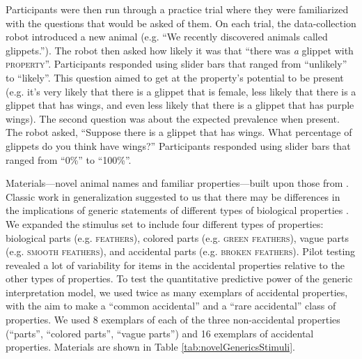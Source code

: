 \documentclass[10pt,letterpaper]{article}
\begin{document}
Participants were then run through a practice trial where they were familiarized with the questions that would be asked of them. 
On each trial, the data-collection robot introduced a new animal (e.g. ``We recently discovered animals called glippets.''). 
The robot then asked how likely it was that ``there was \emph{a} glippet with \textsc{property}''. 
Participants responded using slider bars that ranged from ``unlikely'' to ``likely''.
This question aimed to get at the property's potential to be present
(e.g. it's very likely that there is a glippet that is female, less likely that there is a glippet that has wings, and even less likely that there is a glippet that has purple wings). 
The second question was about the expected prevalence when present. 
The robot asked, ``Suppose there is a glippet that has wings. What percentage of glippets do you think have wings?'' 
Participants responded using slider bars that ranged from ``0\%'' to ``100\%''.


Materials---novel animal names and familiar properties---built upon those from . 
Classic work in generalization suggested to us that there may be differences in the implications of generic statements of different types of biological properties \cite{Nisbett1983}. 
We expanded the stimulus set to include four different types of properties: biological parts (e.g. \textsc{feathers}), colored parts (e.g. \textsc{green feathers}), vague parts (e.g. \textsc{smooth feathers}), and accidental parts (e.g. \textsc{broken feathers}). 
Pilot testing revealed a lot of variability for items in the accidental properties relative to the other types of properties. 
To test the quantitative predictive power of the generic interpretation model, we used twice as many exemplars of accidental properties, with the aim to make a ``common accidental'' and a ``rare accidental'' class of properties. 
We used 8 exemplars of each of the three non-accidental properties (``parts'', ``colored parts'', ``vague parts'') and 16 exemplars of accidental properties.
Materials are shown in Table \ref{tab:novelGenericsStimuli}.
\end{document}
